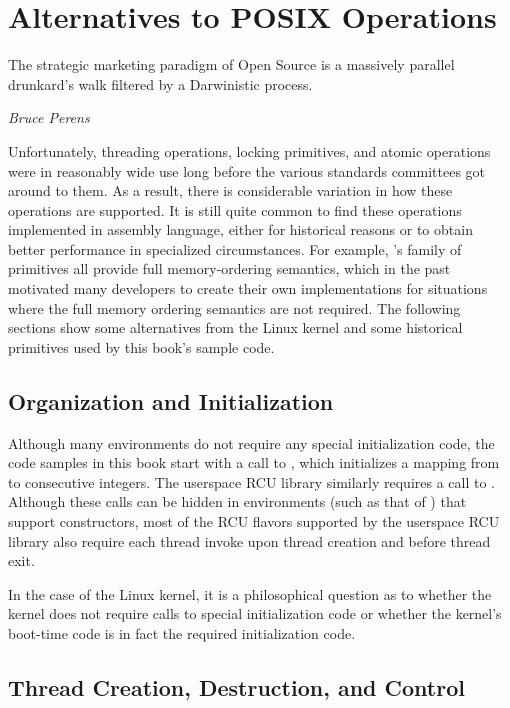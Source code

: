 \section{Alternatives to POSIX Operations}
\label{sec:toolsoftrade:Alternatives to POSIX Operations}
%
\epigraph{The strategic marketing paradigm of Open Source is a massively
	  parallel drunkard's walk filtered by a Darwinistic process.}
	 {\emph{Bruce Perens}}

Unfortunately, threading operations, locking primitives, and atomic
operations were in reasonably wide use long before the various standards
committees got around to them.
As a result, there is considerable variation in how these operations
are supported.
It is still quite common to find these operations implemented in
assembly language, either for historical reasons or to obtain better
performance in specialized circumstances.
For example, \GCC's  family of primitives all provide full
memory-ordering semantics, which in the past motivated many developers
to create their own implementations for situations where the full memory
ordering semantics are not required.
The following sections show some alternatives from the Linux kernel
and some historical primitives used by this book's sample code.

\subsection{Organization and Initialization}
\label{sec:toolsoftrade:Organization and Initialization}

Although many environments do not require any special initialization
code, the code samples in this book start with a call to ,
which initializes a mapping from  to consecutive integers.
The userspace RCU library similarly requires a call to .
Although these calls can be hidden in environments (such as that of
\GCC) that support constructors,
most of the RCU flavors supported by the userspace RCU library
also require each thread invoke  upon thread
creation and  before thread exit.

In the case of the Linux kernel, it is a philosophical question as to
whether the kernel does not require calls to special initialization
code or whether the kernel's boot-time code is in fact the required
initialization code.

\subsection{Thread Creation, Destruction, and Control}
\label{sec:toolsoftrade:Thread Creation, Destruction, and Control}

